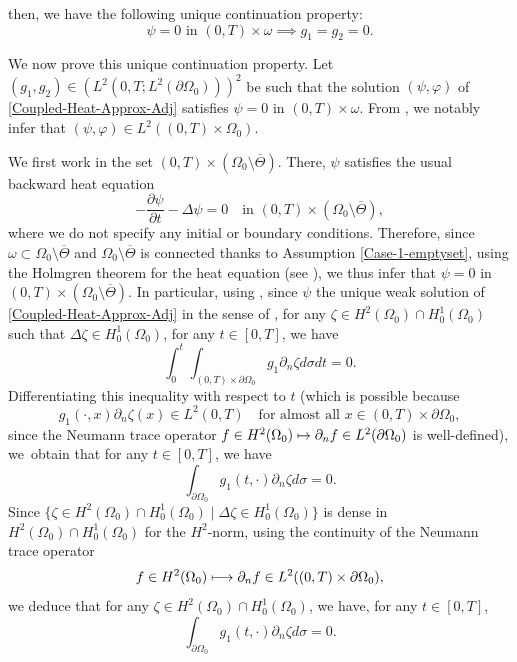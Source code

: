 \documentclass[10pt,a4paper]{amsart}
\newcommand\mto{\mathchoice{\longmapsto}{\mapsto}{\mapsto}{\mapsto}}
\theoremstyle{definition}
\begin{document}
then, we have the following unique continuation property:
\begin{equation}
\label{UC-Adj-Coupled}
\psi = 0 \text{ in } (0,T) \times \omega \implies g_1 = g_2 = 0.
\end{equation}

We now prove this unique continuation property. Let $(g_1, g_2) \in (L^2(0,T; L^2(\partial\Omega_0)))^2$ be such that the solution $(\psi, \varphi)$ of \eqref{Coupled-Heat-Approx-Adj} satisfies $\psi = 0$ in $(0,T) \times \omega$. From \cite[(15.17--18), p.\,86]{LionsMagenes2}, we notably infer that $(\psi,\varphi)\in L^2((0,T)\times\Omega_0)$.

We first work in the set $(0,T) \times (\Omega_0 \setminus \overline{\Theta})$. There, $\psi$ satisfies the usual backward heat equation
\[
-\dfrac{\partial \psi}{\partial t}-\Delta \psi =0\quad\text{in }(0,T) \times(\Omega_0 \setminus \overline{\Theta}),
\]
where we do not specify any initial or boundary conditions.
Therefore, since $\omega \subset \Omega_0\setminus {\overline{\Theta}}$ and $\Omega_0\setminus {\overline{\Theta}}$ is connected thanks to Assumption \eqref{Case-1-emptyset}, using the Holmgren theorem for the heat equation (see \eg \cite[\S8.6 \& Th.\,8.6.5]{Hormander-2003}), we thus infer that $\psi = 0$ in $(0,T) \times (\Omega_0 \setminus \overline{\Theta})$.
In particular, using \cite[Prop.\,7.1.3]{TWBook}, since $\psi$ the unique weak solution of \eqref{Coupled-Heat-Approx-Adj} in the sense of \cite[Def.\,7.1.2, p.\,342]{TWBook}, for any $\zeta\in H^2(\Omega_0)\cap H^1_0(\Omega_0)$ such that $\Delta \zeta \in H^1_0(\Omega_0)$, for any $t\in [0,T]$, we have
\[
\int_0^t\int_{(0,T)\times\partial\Omega_0}g_1\partial_n \zeta d\sigma dt =0.
\]
Differentiating this inequality with respect to $t$ (which is possible because
\[
g_1(\cdot,x)\partial_n \zeta(x) \in L^2(0,T)\quad \text{for almost all $x\in (0,T)\times\partial\Omega_0$},
\]
since the Neumann trace operator $f\in H^2(\Omega_0) \mto \partial_n f\in L^2(\partial\Omega_0)$ is well-defined), we~obtain that for any $t\in [0,T]$, we have
\[
\int_{\partial\Omega_0}g_1(t,\cdot)\partial_n \zeta d\sigma =0.
\]
Since $\{\zeta \in H^2(\Omega_0)\cap H^1_0(\Omega_0)\mid \Delta \zeta \in H^1_0(\Omega_0)\}$ is dense in $H^2(\Omega_0)\cap H^1_0(\Omega_0)$ for the $H^2$-norm, using the continuity of the Neumann trace operator
\[
f\in H^2(\Omega_0) \mto \partial_n f\in L^2((0,T)\times\partial\Omega_0),
\]
we deduce that for any $\zeta\in H^2(\Omega_0)\cap H^1_0(\Omega_0)$, we have, for any $t\in [0,T]$,
\[
\int_{\partial\Omega_0}g_1(t,\cdot)\partial_n \zeta d\sigma =0.
\]
\end{document}
